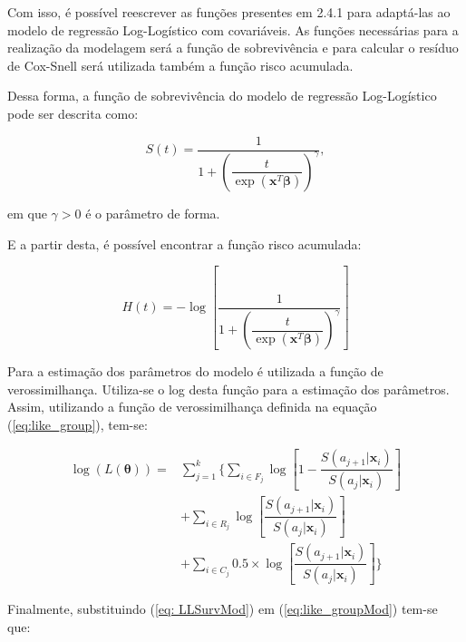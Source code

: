 \documentclass[a4paper,12pt]{article}
\begin{document}
Com isso, é possível reescrever as funções presentes em 2.4.1 para adaptá-las ao modelo de regressão Log-Logístico com covariáveis. As funções necessárias para a realização da modelagem será a função de sobrevivência e para calcular o resíduo de Cox-Snell será utilizada também a função risco acumulada.

Dessa forma, a função de sobrevivência do modelo de regressão Log-Logístico pode ser descrita como:

\begin{equation} \label{eq: LLSurvMod}
  S(t) = \dfrac{1}{1 + \left(\dfrac{t}{\exp(\boldsymbol{x}^T\boldsymbol{\beta})}\right)^{\gamma}},
\end{equation}

em que $\gamma > 0$ é o parâmetro de forma.

E a partir desta, é possível encontrar a função risco acumulada:

\begin{equation} \label{eq: HazLLMod}
H(t) = - \log\left[\dfrac{1}{1 + \left(\dfrac{t}{\exp(\boldsymbol{x}^T\boldsymbol{\beta})}\right)^{\gamma}}\right]
\end{equation}

Para a estimação dos parâmetros do modelo é utilizada a função de verossimilhança. Utiliza-se o log desta função para a estimação dos parâmetros. Assim, utilizando a função de verossimilhança definida na equação (\ref{eq:like_group}), tem-se:

\begin{equation} \label{eq:like_groupMod}
  \begin{split}
  \log(L(\boldsymbol{\theta}))  =  &\sum\limits_{j=1}^k\Bigg\{ \sum\limits_{i\in F_j} \log\left[1 - \dfrac{S(a_{j+1}|\boldsymbol{x}_i)}{S(a_{j}|\boldsymbol{x}_i)}\right] \\
    & + \sum\limits_{i\in R_j} \log\left[\dfrac{S(a_{j+1}|\boldsymbol{x}_i)}{S(a_{j}|\boldsymbol{x}_i)}\right] \\
    & + \sum\limits_{i\in C_j} 0.5\times\log\left[\dfrac{S(a_{j+1}|\boldsymbol{x}_i)}{S(a_{j}|\boldsymbol{x}_i)}\right]\Bigg\}
\end{split}
\end{equation}

Finalmente, substituindo (\ref{eq: LLSurvMod}) em (\ref{eq:like_groupMod}) tem-se que:
\end{document}
